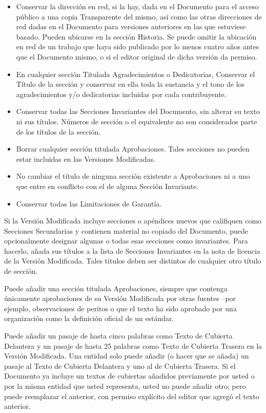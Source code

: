 \begin{itemize}
\item Conservar la dirección en red, si la hay, dada en el Documento
para el acceso público a una copia Transparente del mismo, así
como las otras direcciones de red dadas en el Documento para
versiones anteriores en las que estuviese basado. Pueden ubicarse
en la sección Historia. Se puede omitir la ubicación en red de un
trabajo que haya sido publicado por lo menos cuatro años antes que
el Documento mismo, o si el editor original de dicha versión da
permiso.

\item En cualquier sección Titulada Agradecimientos o Dedicatorias,
Conservar el Título de la sección y conservar en ella toda la
sustancia y el tono de los agradecimientos y/o dedicatorias
incluidas por cada contribuyente.

\item Conservar todas las Secciones Invariantes del Documento, sin
alterar su texto ni sus títulos. Números de sección o el
equivalente no son considerados parte de los títulos de la
sección.

\item Borrar cualquier sección titulada Aprobaciones. Tales secciones
no pueden estar incluidas en las Versiones Modificadas.

\item No cambiar el título de ninguna sección existente a
Aprobaciones ni a uno que entre en conflicto con el de alguna
Sección Invariante.

\item Conservar todas las Limitaciones de Garantía.

\end{itemize}

Si la Versión Modificada incluye secciones o apéndices nuevos que
califiquen como Secciones Secundarias y contienen material no copiado
del Documento, puede opcionalmente designar algunas o todas esas
secciones como invariantes. Para hacerlo, añada sus títulos a la lista
de Secciones Invariantes en la nota de licencia de la Versión
Modificada. Tales títulos deben ser distintos de cualquier otro título
de sección.

Puede añadir una sección titulada Aprobaciones, siempre que contenga
únicamente aprobaciones de su Versión Modificada por otras fuentes
--por ejemplo, observaciones de peritos o que el texto ha sido
aprobado por una organización como la definición oficial de un
estándar.

Puede añadir un pasaje de hasta cinco palabras como Texto de Cubierta
Delantera y un pasaje de hasta 25 palabras como Texto de Cubierta
Trasera en la Versión Modificada. Una entidad solo puede añadir (o
hacer que se añada) un pasaje al Texto de Cubierta Delantera y uno al
de Cubierta Trasera. Si el Documento ya incluye un textos de cubiertas
añadidos previamente por usted o por la misma entidad que usted
representa, usted no puede añadir otro; pero puede reemplazar el
anterior, con permiso explícito del editor que agregó el texto
anterior.

